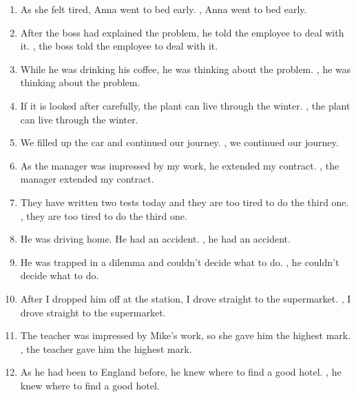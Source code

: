 \begin{enumerate}
      \item As she felt tired, Anna went to bed early. \underline{\hspace{2cm}}, Anna
            went to bed early.
      \item After the boss had explained the problem, he told the employee to deal with
            it. \underline{\hspace{2cm}}, the boss told the employee to deal with it.
      \item While he was drinking his coffee, he was thinking about the problem.
            \underline{\hspace{2cm}}, he was thinking about the problem.
      \item If it is looked after carefully, the plant can live through the winter.
            \underline{\hspace{2cm}}, the plant can live through the winter.
      \item We filled up the car and continued our journey. \underline{\hspace{2cm}},
            we continued our journey.
      \item As the manager was impressed by my work, he extended my contract.
            \underline{\hspace{2cm}}, the manager extended my contract.
      \item They have written two tests today and they are too tired to do the third
            one. \underline{\hspace{2cm}}, they are too tired to do the third one.
      \item He was driving home. He had an accident. \underline{\hspace{2cm}}, he had
            an accident.
      \item He was trapped in a dilemma and couldn’t decide what to do.
            \underline{\hspace{2cm}}, he couldn’t decide what to do.
      \item After I dropped him off at the station, I drove straight to the supermarket.
            \underline{\hspace{2cm}}, I drove straight to the supermarket.
      \item The teacher was impressed by Mike’s work, so she gave him the highest mark.
            \underline{\hspace{2cm}}, the teacher gave him the highest mark.
      \item As he had been to England before, he knew where to find a good hotel.
            \underline{\hspace{2cm}}, he knew where to find a good hotel.
\end{enumerate}

